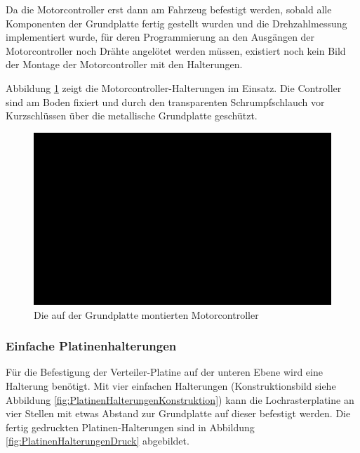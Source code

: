 Da die Motorcontroller erst dann am Fahrzeug befestigt werden, sobald alle Komponenten der Grundplatte fertig gestellt wurden und die Drehzahlmessung implementiert wurde, für deren Programmierung an den Ausgängen der Motorcontroller noch Drähte angelötet werden müssen, existiert noch kein Bild der Montage der Motorcontroller mit den Halterungen.\vspace{11pt}

Abbildung \ref{fig:MotorcontrollerHalterungMontage} zeigt die Motorcontroller-Halterungen im Einsatz. Die Controller sind am Boden fixiert und durch den transparenten Schrumpfschlauch vor Kurzschlüssen über die metallische Grundplatte geschützt.

\begin{figure}[H] %
\includegraphics[width=.85\textwidth]{sec2/images/3DAnbaukomponenten/Montagebilder/MotorcontrollerHalterungMontage} 
\centering
\captionsetup{width=.95\textwidth}
\caption[Die auf der Grundplatte montierten Motorcontroller]{Die auf der Grundplatte montierten Motorcontroller}
\centering
\label{fig:MotorcontrollerHalterungMontage}
\end{figure}

\subsubsection{Einfache Platinenhalterungen}\label{Sec2Sub2SubSub5}

Für die Befestigung der Verteiler-Platine auf der unteren Ebene wird eine Halterung benötigt. Mit vier einfachen Halterungen (Konstruktionsbild siehe Abbildung \ref{fig:PlatinenHalterungenKonstruktion}) kann die Lochrasterplatine an vier Stellen mit etwas Abstand zur Grundplatte auf dieser befestigt werden. Die fertig gedruckten Platinen-Halterungen sind in Abbildung \ref{fig:PlatinenHalterungenDruck} abgebildet.

